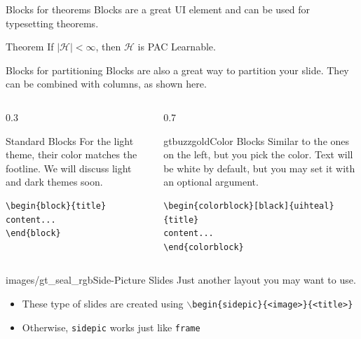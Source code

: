 \documentclass{beamer}
\begin{document}
\begin{frame}[fragile]{Blocks for theorems}
Blocks are a great UI element and can be used for typesetting theorems.
\begin{block}{Theorem}
If $\mid \mathcal{H} \mid < \infty$, then $\mathcal{H}$ is PAC Learnable.
\end{block}
\end{frame}


\begin{frame}[fragile]{Blocks for partitioning}
Blocks are also a great way to partition your slide. They can be combined with columns, as shown here.
\begin{columns}
\begin{column}{0.3\textwidth}
\begin{block}{Standard Blocks}
For the light theme, their color matches the footline. We will discuss light and dark themes soon.
\begin{verbatim}
\begin{block}{title}
content...
\end{block}
\end{verbatim}
\end{block}
\end{column}
\begin{column}{0.7\textwidth}
\begin{colorblock}[black]{gtbuzzgold}{Color Blocks}
Similar to the ones on the left, but you pick the color. Text will be white by 
default, but you may set it with an optional argument.
\small
\begin{verbatim}
\begin{colorblock}[black]{uihteal}{title}
content...
\end{colorblock}
\end{verbatim}
\end{colorblock}
\end{column}
\end{columns}
\end{frame}


\begin{sidepic}{images/gt_seal_rgb}{Side-Picture Slides}
Just another layout you may want to use.
\begin{itemize}
\item These type of slides are created using \texttt{$\backslash$begin\{sidepic\}\{<image>\}\{<title>\}}
\item Otherwise, \texttt{sidepic} works just like \texttt{frame}
\end{itemize}
\end{sidepic}
\end{document}
